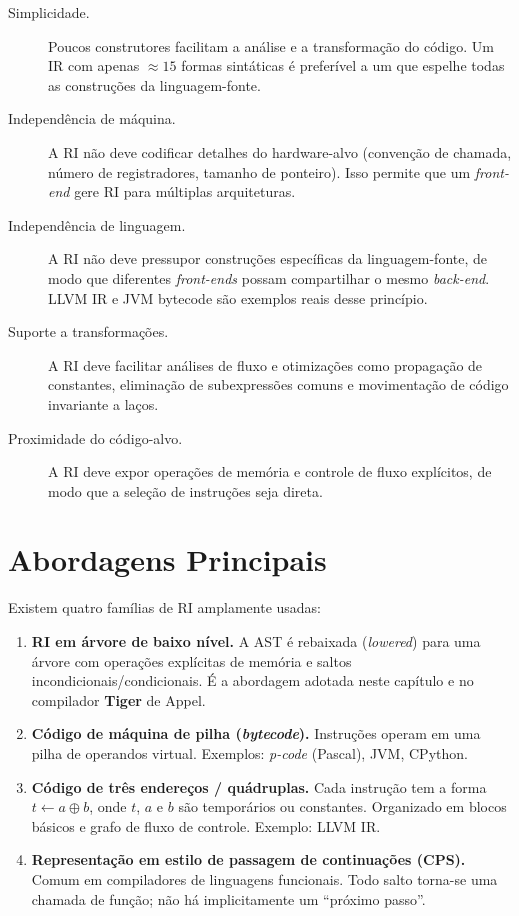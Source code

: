 \begin{description}
  \item[Simplicidade.] Poucos construtores facilitam a análise e a
    transformação do código.  Um IR com apenas $\approx 15$ formas sintáticas
    é preferível a um que espelhe todas as construções da linguagem-fonte.
  \item[Independência de máquina.] A RI não deve codificar detalhes do
    hardware-alvo (convenção de chamada, número de registradores, tamanho de
    ponteiro).  Isso permite que um \emph{front-end} gere RI para
    múltiplas arquiteturas.
  \item[Independência de linguagem.] A RI não deve pressupor construções
    específicas da linguagem-fonte, de modo que diferentes \emph{front-ends}
    possam compartilhar o mesmo \emph{back-end}.  LLVM IR e JVM bytecode são
    exemplos reais desse princípio.
  \item[Suporte a transformações.] A RI deve facilitar análises de fluxo e
    otimizações como propagação de constantes, eliminação de subexpressões
    comuns e movimentação de código invariante a laços.
  \item[Proximidade do código-alvo.] A RI deve expor operações de memória e
    controle de fluxo explícitos, de modo que a seleção de instruções seja
    direta.
\end{description}

\section{Abordagens Principais}\label{sec:ir-abordagens}

Existem quatro famílias de RI amplamente usadas:

\begin{enumerate}
  \item \textbf{RI em árvore de baixo nível.} A AST é rebaixada
    (\emph{lowered}) para uma árvore com operações explícitas de memória e
    saltos incondicionais/condicionais.  É a abordagem adotada neste capítulo
    e no compilador \textbf{Tiger} de Appel.
  \item \textbf{Código de máquina de pilha (\emph{bytecode}).} Instruções
    operam em uma pilha de operandos virtual.  Exemplos: \emph{p-code}
    (Pascal), JVM, CPython.
  \item \textbf{Código de três endereços / quádruplas.} Cada instrução tem a
    forma $t \leftarrow a \oplus b$, onde $t$, $a$ e $b$ são temporários ou
    constantes.  Organizado em blocos básicos e grafo de fluxo de controle.
    Exemplo: LLVM IR.
  \item \textbf{Representação em estilo de passagem de continuações (CPS).}
    Comum em compiladores de linguagens funcionais.  Todo salto torna-se uma
    chamada de função; não há implicitamente um ``próximo passo''.
\end{enumerate}

